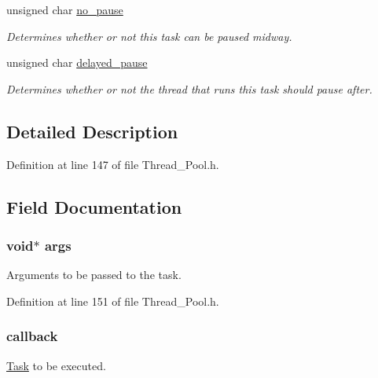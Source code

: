 \begin{DoxyCompactItemize}
unsigned char \hyperlink{struct_task_ac11c21efa7d7fd20a420bc7bb9636765}{no\+\_\+pause}
\begin{DoxyCompactList}\small\item\em Determines whether or not this task can be paused midway. \end{DoxyCompactList}\item 
unsigned char \hyperlink{struct_task_a9a343e286620218fe1675a782196f647}{delayed\+\_\+pause}
\begin{DoxyCompactList}\small\item\em Determines whether or not the thread that runs this task should pause after. \end{DoxyCompactList}\end{DoxyCompactItemize}


\subsection{Detailed Description}


Definition at line 147 of file Thread\+\_\+\+Pool.\+h.



\subsection{Field Documentation}
\hypertarget{struct_task_add0eb34e0cef9e763462cf9080f9be0a}{}
\subsubsection[{args}]{\setlength{\rightskip}{0pt plus 5cm}void$\ast$ args}\label{struct_task_add0eb34e0cef9e763462cf9080f9be0a}


Arguments to be passed to the task. 



Definition at line 151 of file Thread\+\_\+\+Pool.\+h.

\hypertarget{struct_task_a59d2df9ef30fbe9c225b6422f2dfa07d}{}
\subsubsection[{callback}]{ callback}\label{struct_task_a59d2df9ef30fbe9c225b6422f2dfa07d}


\hyperlink{struct_task}{Task} to be executed. 



